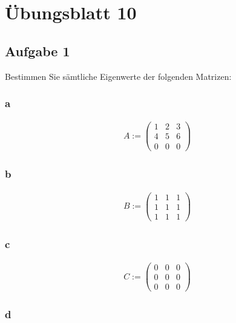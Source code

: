 \chapter{Übungsblatt 10}

\section{Aufgabe 1}

Bestimmen Sie sämtliche Eigenwerte der folgenden Matrizen:

\subsection{a}

\begin{align*}
    A := \begin{pmatrix}
        1 & 2 & 3 \\
        4 & 5 & 6 \\ 
        0 & 0 & 0
    \end{pmatrix}
\end{align*}

\subsection{b}

\begin{align*}
    B := \begin{pmatrix}
        1 & 1 & 1 \\
        1 & 1 & 1 \\
        1 & 1 & 1
    \end{pmatrix}
\end{align*}

\subsection{c}

\begin{align*}
    C := \begin{pmatrix}
        0 & 0 & 0 \\
        0 & 0 & 0 \\
        0 & 0 & 0
    \end{pmatrix}
\end{align*}

\subsection{d}

